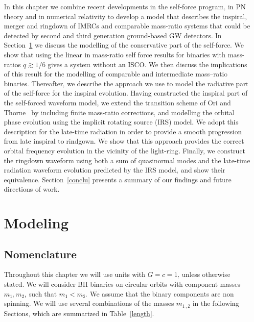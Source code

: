 In this chapter we combine recent developments in the self-force program, in PN theory and in numerical relativity to develop a model that describes the inspiral, merger and ringdown of IMRCs and comparable mass-ratio systems that could be detected by second and third generation ground-based GW detectors. In Section~\ref{one} we discuss the modelling of the conservative part of the self-force. We show that using the linear in mass-ratio self force results for binaries with mass-ratios \(q\gtrsim1/6\) gives a system without an ISCO. We then discuss the implications of this result for the modelling of comparable and intermediate mass--ratio binaries.  Thereafter, we describe the approach we use to model the radiative part of the self-force for the inspiral evolution. Having constructed the inspiral part of the self-forced waveform model, we extend the transition scheme of  Ori and Thorne~\cite{ori} by including finite mass-ratio corrections, and modelling the orbital phase evolution using the implicit rotating 
source (IRS) model. We adopt this description for the late-time radiation in order to provide a smooth progression from late inspiral to rindgown.  We show that this approach provides the correct orbital frequency evolution in the vicinity of the light-ring. Finally, we construct the ringdown waveform using both a sum of quasinormal modes and the late-time radiation waveform evolution predicted by the IRS model, and show their equivalence. Section~\ref{conclu} presents a summary of our findings and future directions of work. 


\section{Modeling}
\label{one}


\subsection{Nomenclature}
Throughout this chapter we will use units with \(G=c=1\), unless otherwise stated. We will consider BH  binaries on circular orbits with component masses \(m_1, m_2\), such that \(m_1 < m_2\). We assume that the binary components are non spinning. We will use several combinations of the masses \(m_{1\, ,2}\) in the following Sections, which are summarized in Table~\ref{length}.

